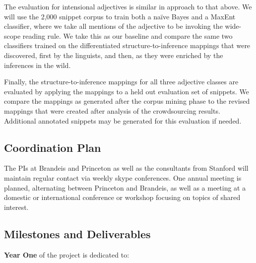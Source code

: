 \documentclass[10pt]{article}
\begin{document}

The evaluation for intensional adjectives is similar in approach to that above. We will use the 2,000 snippet corpus  to train both a na\"ive Bayes and a MaxEnt classifier, where we take all mentions of the adjective to be invoking the   wide-scope reading rule. We take this as our baseline and compare the same two classifiers trained on the differentiated structure-to-inference mappings that were discovered, first by the linguists, and then, as they were enriched by the inferences in the wild. 


Finally, the structure-to-inference mappings for all three adjective classes are evaluated by applying the mappings to a held out evaluation set of snippets. We compare the mappings as generated after the corpus mining phase to the revised mappings that were created after analysis of the crowdsourcing results. Additional annotated snippets may be generated for this evaluation if needed. 

\subsection{Coordination Plan}

The PIs at Brandeis and Princeton as well as the consultants from Stanford will maintain regular contact
via weekly skype conferences. One annual meeting is planned, alternating between Princeton 
and Brandeis, as well as a meeting at a domestic or international conference or workshop focusing 
on topics of shared interest. 

\subsection{Milestones and Deliverables}


 
{\bf Year One} of the project is dedicated to: 
\end{document}

